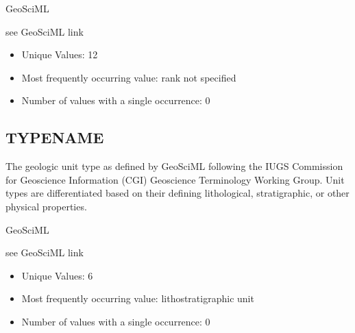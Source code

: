 \documentclass[letterpaper,10pt,english]{sphinxmanual}
\begin{document}
GeoSciML

see GeoSciML link




\begin{itemize}
\item {} 
Unique Values: 12

\item {} 
Most frequently occurring value: rank not specified

\item {} 
Number of values with a single occurrence: 0

\end{itemize}


\subsection{TYPENAME}
\label{\detokenize{field_glossary:typename}}
The geologic unit type as defined by GeoSciML following the IUGS Commission for Geoscience Information (CGI) Geoscience Terminology Working Group. Unit types are differentiated based on their defining lithological, stratigraphic, or other physical properties.

GeoSciML

see GeoSciML link




\begin{itemize}
\item {} 
Unique Values: 6

\item {} 
Most frequently occurring value: lithostratigraphic unit

\item {} 
Number of values with a single occurrence: 0

\end{itemize}
\end{document}
